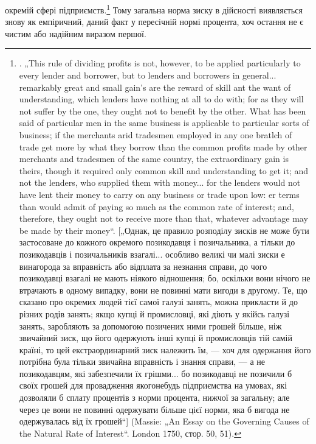 окремій сфері підприємств.\footnote{
. „This rule of dividing profits is not, however, to be applied particularly to
every lender and borrower, but to lenders and borrowers in general... remarkably
great and small gain's are the reward of skill ant the want of understanding, which
lenders have nothing at all to do with; for as they will not suffer by the one,
they ought not to benefit by the other. What has been said of particular men in
the same business is applicable to particular sorts of business; if the merchants
arid tradesmen employed in any one bratlch of trade get more by what they borrow
than the common profits made by other merchants and tradesmen of the same
country, the extraordinary gain is theirs, though it required only common skill
and understanding to get it; and not the lenders, who supplied them with money...
for the lenders would not have lent their money to carry on any business or trade
upon low: er terms than would admit of paying so much as the common rate of
interest; and, therefore, they ought not to receive more than that, whatever advantage
may be made by their money“. [„Однак, це правило розподілу зисків не
може бути застосоване до кожного окремого позикодавця і позичальника, а
тільки до позикодавців і позичальників взагалі... особливо великі чи малі зиски
е винагорода за вправність або відплата за незнання справи, до чого позикодавці
взагалі не мають ніякого відношення; бо, оскільки вони нічого не втрачають
в одному випадку, вони не повинні мати вигоди в другому. Те, що сказано
про окремих людей тієї самої галузі занять, можна прикласти й до різних
родів занять; якщо купці й промисловці, які діють у якійсь галузі занять, заробляють
за допомогою позичених ними грошей більше, ніж звичайний зиск,
що його одержують інші купці й промисловців тій самій країні, то цей екстраординарний
зиск належить їм, — хоч для одержання його потрібна була тільки
звичайна вправність і знання справи, — а не позикодавцям, які забезпечили
їх грішми... бо позикодавці не позичили б своїх грошей для провадження якогонебудь
підприємства на умовах, які дозволяли б сплату процентів з норми
процента, нижчої за загальну; але через це вони не повинні одержувати більше
цієї норми, яка б вигода не одержувалась від їх грошей“] (Massie: „An
Essay on the Governing Causes of the Natural Rate of Interest“. London 1750,
стор. 50, 51).
} Тому загальна норма зиску в дійсності
виявляється знову як емпіричний, даний факт у пересічній
нормі процента, хоч остання не є чистим або надійним виразом
першої.

